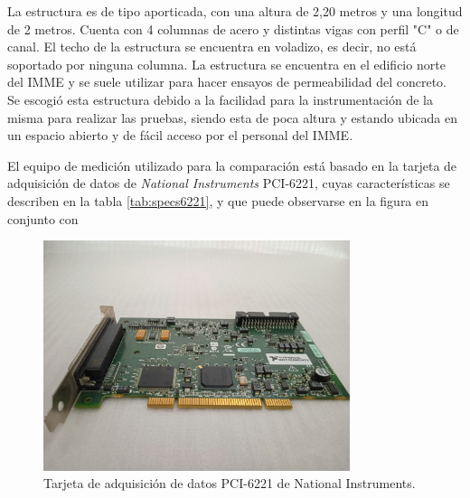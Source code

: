 La estructura es de tipo aporticada, con una altura de 2,20 metros y una longitud de 2 metros. Cuenta con 4 columnas de acero y distintas vigas con perfil "C" o de canal. El techo de la estructura se encuentra en voladizo, es decir, no está soportado por ninguna columna. La estructura se encuentra en el edificio norte del IMME y se suele utilizar para hacer ensayos de permeabilidad del concreto. Se escogió esta estructura debido a la facilidad para la instrumentación de la misma para realizar las pruebas, siendo esta de poca altura y estando ubicada en un espacio abierto y de fácil acceso por el personal del IMME.

El equipo de medición utilizado para la comparación está basado en la tarjeta de adquisición de datos de \textit{National Instruments} PCI-6221, cuyas características se describen en la tabla \ref{tab:specs6221}, y que puede observarse en la figura  en conjunto con 


\begin{figure}[H]
    \centering
    \includegraphics[width = 0.8\textwidth]{imagenes/cap3_resultados/Ensayos/NationalInstruments_PCI6221.jpg}
    \caption{Tarjeta de adquisición de datos PCI-6221 de National Instruments.}
    \label{fig:DAQ6221}
\end{figure}

